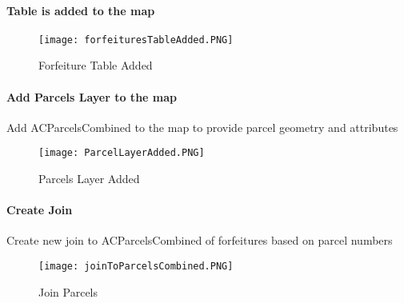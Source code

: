 \paragraph*{Table is added to the map\texorpdfstring{\\}{}}
\begin{figure}[h!]
\centering
    \texttt{[image: forfeituresTableAdded.PNG]}
\caption{Forfeiture Table Added}
\end{figure}
\clearpage
\paragraph[Add Parcels Layer to the map]{Add Parcels Layer to the map\texorpdfstring{\\}{}}
\noindent Add ACParcelsCombined to the map to provide parcel geometry and attributes
\vspace{.25in}

\begin{figure}[h!]
\centering
    \texttt{[image: ParcelLayerAdded.PNG]}
\caption{Parcels Layer Added}
\end{figure}
\clearpage
\paragraph[Create Join]{Create Join\texorpdfstring{\\}{}}
\noindent Create new join to ACParcelsCombined of forfeitures based on parcel numbers
\vspace{.25in}

\begin{figure}[h!]
\centering
    \texttt{[image: joinToParcelsCombined.PNG]}
\caption{Join Parcels}
\end{figure}
\clearpage
